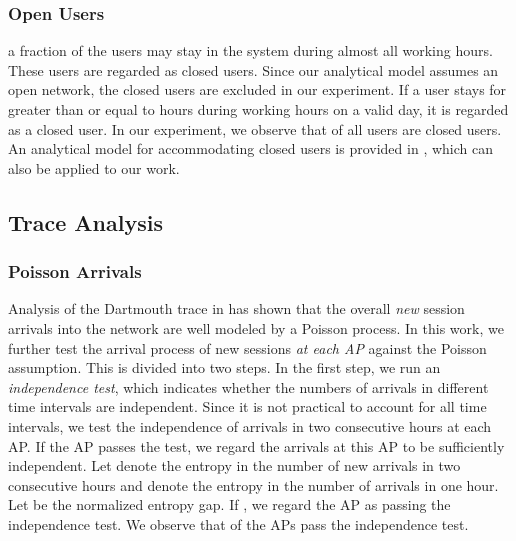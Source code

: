 \subsubsection{Open Users}
a fraction of the users may stay in the system during almost all working hours. These users are regarded as closed users.  Since our analytical model assumes an open network, the closed users are excluded in our experiment.  If a user stays for greater than or equal to  hours during working hours on a valid day, it is regarded as a closed user. In our experiment, we observe that  of all users are closed users.  An analytical model for accommodating closed users is provided in \cite{Mobility-Core1}, which can also be applied to our work.



\subsection{Trace Analysis}

\subsubsection{Poisson Arrivals} \label{section_arrival}

Analysis of the Dartmouth trace in \cite{Mobility-Core1} has shown that the overall \emph{new} session arrivals into the network are well modeled by a Poisson process.  In this work, we further test the arrival process of new sessions \emph{at each AP} against the Poisson assumption.  This is divided into two steps. In the first step, we run an \emph{independence test}, which indicates whether the numbers of arrivals in different time intervals are independent. Since it is not practical to account for all time intervals, we test the independence of arrivals in two consecutive hours at each AP. If the AP passes the test, we regard the arrivals at this AP to be sufficiently independent. Let  denote the entropy in the number of new arrivals in two consecutive hours and  denote the entropy in the number of arrivals in one hour. Let  be the normalized entropy gap. If , we regard the AP as passing the independence test.  We observe that  of the  APs pass the independence test.

